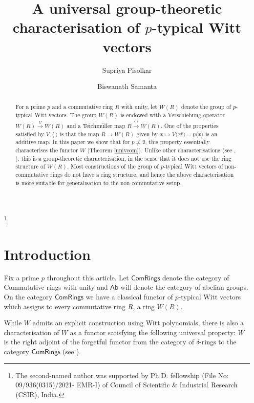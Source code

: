 \documentclass[10pt]{amsart}
\theoremstyle{plain}
\theoremstyle{definition}
\newcommand{\ab}[1]{\langle {#1} \rangle}
\newcommand{\Com}{{\mathsf{ComRings}}}
\begin{document}
\title{A universal group-theoretic characterisation of $p$-typical Witt vectors} 

\author[S. Pisolkar]{Supriya Pisolkar} \address{ Indian Institute of
Science, Education and Research (IISER),  Homi Bhabha Road, Pashan,
Pune - 411008, India}  

\author[B. Samanta] {Biswanath Samanta} \address{ Indian Institute of
Science, Education and Research (IISER),  Homi Bhabha Road, Pashan,
Pune - 411008, India}  

\thanks{The second-named author was supported by Ph.D. fellowship (File No: 09/936(0315)/2021-
EMR-I) of Council of Scientific \& Industrial Research (CSIR), India.}


\begin{abstract} 
For a prime $p$ and a commutative ring $R$ with unity, let $W(R)$ denote the group of $p$-typical Witt vectors. The group $W(R)$ is endowed with a Verschiebung operator $W(R)\xrightarrow{V}W(R)$ and a Teichm\"{u}ller map $R\xrightarrow{\ab{ \ }}W(R)$. One of the properties satisfied by $V, \ab{ \ }$ is that the map $R \to W(R)$ given by $x\mapsto V\ab{x^p} - p\ab{x}$ is an additive map. In this paper we show that for $p\neq 2$, this property essentially characterises the functor $W$ (Theorem \ref{univcom}). Unlike other characterisations (see \cite{b}, \cite{J}), this is a group-theoretic characterisation, in the sense that it does not use the ring structure of $W(R)$. Most constructions of the group of $p$-typical Witt vectors of non-commutative rings do not have a ring structure, and hence the above characterisation is more suitable for generalisation to the non-commutative setup.
\end{abstract}
\maketitle 
\section{Introduction}
\noindent Fix a prime $p$ throughout this article. Let  $\Com$ denote the category of Commutative rings with unity and $\mathsf{Ab}$ will denote the category of abelian groups. On the category $\Com$ we have a classical functor of $p$-typical Witt vectors which assigns to every commutative ring $R$, a ring $W(R)$. 

\noindent While $W$ admits an explicit construction \cite{w} using Witt polynomials, there is also a  characterisation of $W$ as a functor satisfying the following universal property: $W$ is the right adjoint of the forgetful functor from the category of $\delta$-rings to the category $\Com$ (see \cite[Theorem 2]{J}).\\
\end{document}
